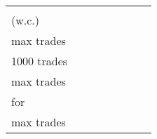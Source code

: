 
\begin{table*}[t]
\centering
\begin{tabular} {|l|r|r|r|r|r|r|r|}


\multicolumn{1}{c}{} & 



\headrow{\footnotesize \shortstack{Max trades \\ (w.c.)}} & 
\headrow{\footnotesize \shortstack{L1 Gas for \\ max trades}} & 
\headrow{\footnotesize \shortstack{Gas for \\1000 trades}} & 
\headrow{\footnotesize Gas for order (avg)} &

\headrow{\footnotesize \shortstack{L1 Gas for \\ max trades}} &
\headrow{\footnotesize \shortstack{L2 ArbGas \\for \\max trades}} &
\headrow{\footnotesize Size}  \\ \hline


\end{tabular}
\end{table*}
